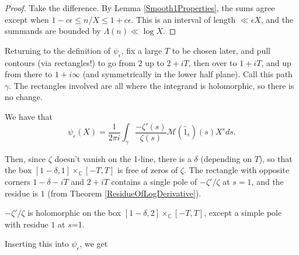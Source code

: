 \begin{proof}
Take the difference. By Lemma \ref{Smooth1Properties}, the sums agree except when $1-c \epsilon \leq n/X \leq 1+c \epsilon$. This is an interval of length $\ll \epsilon X$, and the summands are bounded by $\Lambda(n) \ll \log X$.
\end{proof}



Returning to the definition of $\psi_{\epsilon}$, fix a large $T$ to be chosen later, and pull contours (via rectangles!) to go
from $2$ up to $2+iT$, then over to $1+iT$, and up from there to $1+i\infty$ (and symmetrically in the lower half plane). Call
this path $\gamma$. The
rectangles involved are all where the integrand is holomorphic, so there is no change.
\begin{theorem}\label{SmoothedChebyshevPull1}
We have that
$$\psi_{\epsilon}(X) = \frac{1}{2\pi i}\int_{\gamma}\frac{-\zeta'(s)}{\zeta(s)}
\mathcal{M}(\widetilde{1_{\epsilon}})(s)
X^{s}ds.$$
\end{theorem}



Then, since $\zeta$ doesn't vanish on the 1-line, there is a $\delta$ (depending on $T$), so that the box $[1-\delta,1] \times_{ℂ} [-T,T]$ is free of zeros of $\zeta$.
The rectangle with opposite corners $1-\delta - i T$ and $2+iT$ contains a single pole of $-\zeta'/\zeta$ at $s=1$, and the residue is $1$ (from Theorem \ref{ResidueOfLogDerivative}).
\begin{theorem}\label{ZeroFreeBox}
$-\zeta'/\zeta$ is holomorphic on the box $[1-\delta,2] \times_{ℂ} [-T,T]$, except a simple pole with residue $1$ at $s$=1.
\end{theorem}



Inserting this into $\psi_{\epsilon}$, we get


